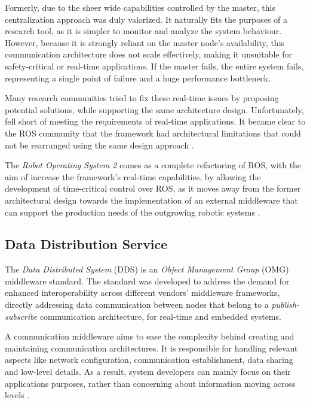 Formerly, due to the sheer wide capabilities controlled by the master, this centralization approach was duly valorized. It naturally fits the purposes of a research tool, as it is simpler to monitor and analyze the system behaviour. However, because it is strongly reliant on the master node's availability, this communication architecture does not scale effectively, making it unsuitable for safety-critical or real-time applications. If the master fails, the entire system fails, representing a single point of failure and a huge performance bottleneck.

Many research communities tried to fix these real-time issues by proposing potential solutions, while supporting the same architecture design. Unfortunately, fell short of meeting the requirements of real-time applications. It became clear to the ROS community that the framework had architectural limitations that could not be rearranged using the same design approach \cite{maruyama2016exploring}.

The \textit{Robot Operating System 2} comes as a complete refactoring of ROS, with the aim of increase the framework's real-time capabilities, by allowing the development of time-critical control over ROS, as it moves away from the former architectural design towards the implementation of an external middleware that can support the production needs of the outgrowing robotic systems \cite{kim2018security, casini2019response}.

\subsection{Data Distribution Service}

The \textit{Data Distributed System} (DDS) \cite{3} is an \textit{Object Management Group} (OMG) middleware standard. The standard was developed to address the demand for enhanced interoperability across different vendors' middleware frameworks, directly addressing data communication between nodes that belong to a \textit{publish-subscribe} communication architecture, for real-time and embedded systems. 

A communication middleware aims to ease the complexity behind creating and maintaining communication architectures. It is responsible for handling relevant aspects like network configuration, communication establishment, data sharing and low-level details. As a result, system developers can mainly focus on their applications purposes, rather than concerning about information moving across levels \cite{dds-what-is}. 


